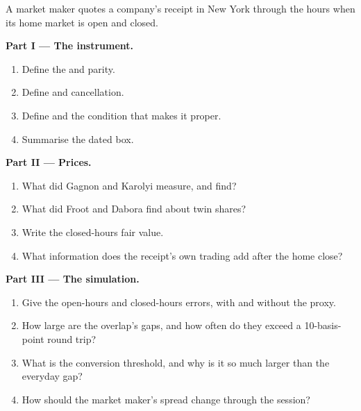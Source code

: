 \begin{problem}\label{pb:hf:depositary-receipts-and-dual-listings:1}
A market maker quotes a company's receipt in New York through the hours when its home market is open and closed.

\medskip\noindent\textbf{Part I --- The instrument.}
\begin{enumerate}
\item Define the  and parity.
\item Define  and cancellation.
\item Define  and the condition that makes it proper.
\item Summarise the dated box.
\end{enumerate}

\medskip\noindent\textbf{Part II --- Prices.}
\begin{enumerate}[resume]
\item What did Gagnon and Karolyi measure, and find?
\item What did Froot and Dabora find about twin shares?
\item Write the closed-hours fair value.
\item What information does the receipt's own trading add after the home close?
\end{enumerate}

\medskip\noindent\textbf{Part III --- The simulation.}
\begin{enumerate}[resume]
\item Give the open-hours and closed-hours errors, with and without the proxy.
\item How large are the overlap's gaps, and how often do they exceed a 10-basis-point round trip?
\item What is the conversion threshold, and why is it so much larger than the everyday gap?
\item How should the market maker's spread change through the session?
\end{enumerate}


\end{problem}
